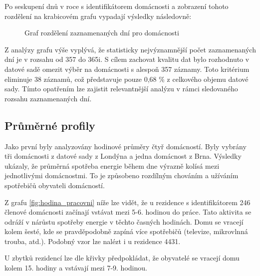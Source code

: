 \documentclass[FM,BP,fonts]{tulthesis}
\begin{document}
Po seskupení dnů v roce s identifikátorem domácnosti a zobrazení tohoto rozdělení na krabicovém grafu vypadají výsledky následovně:

\begin{figure}[htbp]
	\centering
	\caption{Graf rozdělení zaznamenaných dní pro domácnosti }
	\label{fig:domacnosti-v-case-pocet-dni}
\end{figure}


Z analýzy grafu výše vyplývá, že statisticky nejvýznamnější počet zaznamenaných dní je v rozsahu od 357 do 365i. S cílem zachovat kvalitu dat bylo rozhodnuto v datové sadě omezit výběr na domácnosti s alespoň 357 záznamy. Toto kritérium eliminuje 38 záznamů, což představuje pouze 0,68 \% z celkového objemu datové sady. Tímto opatřením lze zajistit relevantnější analýzu v rámci sledovaného rozsahu zaznamenaných dní.


\newpage

\subsection{Průměrné profily}
Jako první byly analyzovány hodinové průměry čtyř domácností. Byly vybrány tři domácnosti z datové sady z Londýna a jedna domácnost z Brna. Výsledky ukázaly, že průměrná spotřeba energie během dne výrazně kolísá mezi jednotlivými domácnostmi. To je způsobeno rozdílným chováním a užíváním spotřebičů obyvateli domácností.

Z grafu \ref{fig:hodina_pracovni} níže lze vidět, že u rezidence s identifikátorem 246 členové domácnosti začínají vstávat mezi 5-6. hodinou do práce. Tato aktivita se odráží v nárůstu spotřeby energie v těchto časných hodinách. Domu se vracejí kolem šesté, kde se pravděpodobně zapíná více spotřebičů (televize, mikrovlnná trouba, atd.). Podobný vzor lze nalézt i u rezidence 4431.

U zbytků rezidencí lze dle křivky předpokládat, že obyvatelé se vracejí domu kolem 15. hodiny a vstávají mezi 7-9. hodinou.
 
\end{document}
